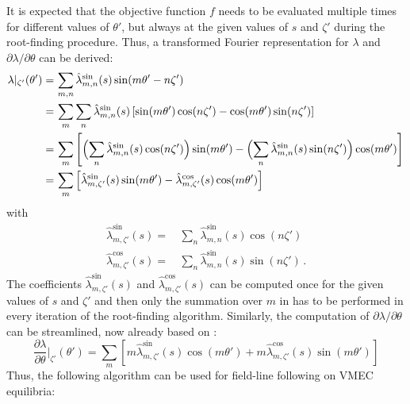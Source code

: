 It is expected that the objective function $f$ needs to be evaluated multiple times
for different values of $\theta'$, but always at the given values of $s$ and $\zeta'$
during the root-finding procedure.
Thus, a transformed Fourier representation for $\lambda$ and $\partial \lambda/\partial \theta$
can be derived:
\begin{align}
 \lambda\vert_{\zeta'}(\theta')
 =&\,
 \sum\limits_{m,n} \hat{\lambda}^\textrm{sin}_{m,n}(s) \sin(m \theta' - n \zeta') \nonumber \\ ~
 =&\,
 \sum\limits_{m} \sum\limits_{n} \hat{\lambda}^\textrm{sin}_{m,n}(s) \left[
   \sin(m \theta') \cos(n \zeta') - \cos(m \theta') \sin(n \zeta')
 \right] \nonumber \\ ~
 =&\,
 \sum\limits_{m} \left[
   \Bigl(\sum\limits_{n} \hat{\lambda}^\textrm{sin}_{m,n}(s) \cos(n \zeta') \Bigr) \sin(m \theta') -
   \Bigl(\sum\limits_{n} \hat{\lambda}^\textrm{sin}_{m,n}(s) \sin(n \zeta') \Bigr) \cos(m \theta')
 \right] \nonumber \\ ~
 =&\,
 \sum\limits_{m} \left[
   \hat{\lambda}^\textrm{sin}_{m,\zeta'}(s) \sin(m \theta') -
   \hat{\lambda}^\textrm{cos}_{m,\zeta'}(s) \cos(m \theta')
 \right] \label{eqn:lambda_at_zetap}
\end{align}
with
\begin{align}
 \hat{\lambda}^\textrm{sin}_{m,\zeta'}(s)
 =&\, \sum\limits_{n} \hat{\lambda}^\textrm{sin}_{m,n}(s) \cos(n \zeta') \label{eqn:lmszeta} \\
 \hat{\lambda}^\textrm{cos}_{m,\zeta'}(s)
 =&\, \sum\limits_{n} \hat{\lambda}^\textrm{sin}_{m,n}(s) \sin(n \zeta') \label{eqn:lmczeta} \, .
\end{align}
The coefficients $\hat{\lambda}^\textrm{sin}_{m,\zeta'}(s)$ and $\hat{\lambda}^\textrm{cos}_{m,\zeta'}(s)$
can be computed once for the given values of $s$ and $\zeta'$
and then only the summation over $m$ in  has to be performed
in every iteration of the root-finding algorithm.
%
Similarly, the computation of $\partial \lambda/\partial \theta$ can be streamlined,
now already based on :
\begin{equation}
 \frac{\partial \lambda}{\partial \theta}\vert_{\zeta'}(\theta')
 =
 \sum\limits_{m} \left[
   m \hat{\lambda}^\textrm{sin}_{m,\zeta'}(s) \cos(m \theta') +
   m \hat{\lambda}^\textrm{cos}_{m,\zeta'}(s) \sin(m \theta')
 \right] \label{eqn:lu_at_zetap}
\end{equation}
Thus, the following algorithm can be used for field-line following on VMEC equilibria:
